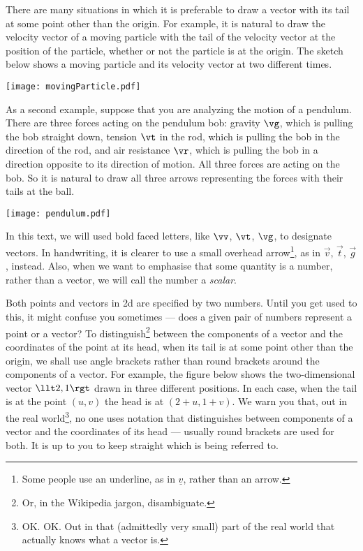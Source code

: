 There are many situations in which it is preferable to draw a vector 
with its tail at some point other than the origin. For example, it is 
natural to draw the velocity vector of a moving particle with the tail
of the velocity vector at the position of the particle, whether or not
the particle is at the origin. The sketch below shows a moving particle
and its velocity vector at two different times.
      \begin{efig} 
      \begin{center}
      \texttt{[image: movingParticle.pdf]}
      \end{center}
      \end{efig}
As a second example, suppose that you are analyzing the motion of a pendulum.
There are three forces acting on the pendulum bob: gravity $\vg$, which
is pulling the bob straight down, tension $\vt$ in the rod, which is
pulling the bob in the direction of the rod, and air resistance $\vr$, 
which is pulling the bob in a direction opposite to its direction of motion.
All three forces are acting on the bob. So it is natural to draw all three
arrows representing the forces with their tails at the ball. 
      \begin{efig} 
      \begin{center}
      \texttt{[image: pendulum.pdf]}
      \end{center}
      \end{efig}

In this text, we will used bold faced letters, like $\vv$, $\vt$, $\vg$,
to designate vectors. In handwriting, it is clearer to use a small 
overhead arrow\footnote{Some people use an underline, as in $\underline{v}$,
rather than an arrow.}, as in $\vec{v}$, $\vec{t}$, $\vec{g}$, instead. 
Also, when we want to emphasise that some quantity is a number,
rather than a vector, we will call the number a \emph{scalar}. 


Both points and vectors in 2d are specified by two numbers. Until 
you get used to this, it might confuse you sometimes --- does a given pair of 
numbers represent a point or a vector?
To distinguish\footnote{Or, in the Wikipedia jargon, disambiguate.}
between the components of a vector and the coordinates 
of the point at its head, when its tail is at some point other than 
the origin, we shall use angle brackets rather than round brackets 
around the components of a vector. For example, the figure below shows 
the two-dimensional vector $\llt 2,1\rgt$ drawn in three different positions.
In each case, when the tail is at the point $(u,v)$ the head is at 
$(2+u,1+v)$. We warn you that, out in the  real world\footnote{OK. OK. Out in 
that (admittedly very small) part of the real world that actually knows 
what a vector is.}, no one uses notation
that distinguishes between components of a vector and the coordinates of its 
head --- usually round brackets are used for both. It is up to you to 
keep straight which is being referred to.

